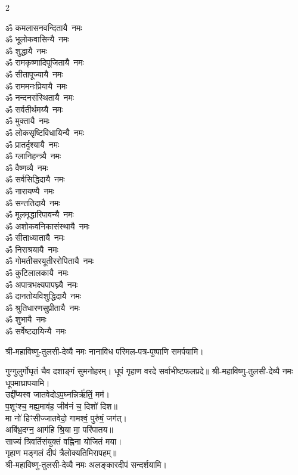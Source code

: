 \begin{multicols}{2}
\begin{flushleft}
ॐ कमलासनवन्दितायै~नमः\\
ॐ भूलोकवासिन्यै~नमः\\
ॐ शुद्धायै~नमः\\
ॐ रामकृष्णादिपूजितायै~नमः\\
ॐ सीतापूज्यायै~नमः\\
ॐ राममनःप्रियायै~नमः\\
ॐ नन्दनसंस्थितायै~नमः\\
ॐ सर्वतीर्थमय्यै~नमः\\
ॐ मुक्तायै~नमः\hfill{}‌\\
ॐ लोकसृष्टिविधायिन्यै~नमः\\
ॐ प्रातर्दृश्यायै~नमः\\
ॐ ग्लानिहन्त्र्यै~नमः\\
ॐ वैष्णव्यै~नमः\\
ॐ सर्वसिद्धिदायै~नमः\\
ॐ नारायण्यै~नमः\\
ॐ सन्ततिदायै~नमः\\
ॐ मूलमृद्धारिपावन्यै~नमः\\
ॐ अशोकवनिकासंस्थायै~नमः\\
ॐ सीताध्यातायै~नमः\hfill{}‌\\
ॐ निराश्रयायै~नमः\\
ॐ गोमतीसरयूतीररोपितायै~नमः\\
ॐ कुटिलालकायै~नमः\\
ॐ अपात्रभक्ष्यपापघ्न्यै~नमः\\
ॐ दानतोयविशुद्धिदायै~नमः\\
ॐ श्रुतिधारणसुप्रीतायै~नमः\\
ॐ शुभायै~नमः\\
ॐ सर्वेष्टदायिन्यै~नमः\hfill{}\\
\end{flushleft}
\end{multicols}
श्री-महाविष्णु-तुलसी-देव्यै नमः नानाविध परिमल-पत्र-पुष्पाणि समर्पयामि।


गुग्गुलुर्गोघृतं चैव दशाङ्गं सुमनोहरम्।
धूपं गृहाण वरदे सर्वाभीष्टफलप्रदे॥
श्री-महाविष्णु-तुलसी-देव्यै नमः धूपमाघ्रापयामि।\\

उद्दी᳚प्यस्व जातवेदोऽप॒घ्नन्निर्ऋ॑तिं॒ मम॑।\\
 प॒शूꣳश्च॒ मह्य॒माव॑ह॒ जीव॑नं च॒ दिशो॑ दिश॥ \\
मा नो॑ हिꣳसीज्जातवेदो॒ गामश्वं॒ पुरु॑षं॒ जग॑त्।\\
अबि॑भ्र॒दग्न॒ आग॑हि श्रि॒या मा॒ परि॑पातय॥ \\
साज्यं त्रिवर्तिसंयुक्तं वह्निना योजितं मया।\\
गृहाण मङ्गलं दीपं त्रैलोक्यतिमिरापहम्॥ \\
श्री-महाविष्णु-तुलसी-देव्यै नमः अलङ्कारदीपं सन्दर्शयामि।\\

